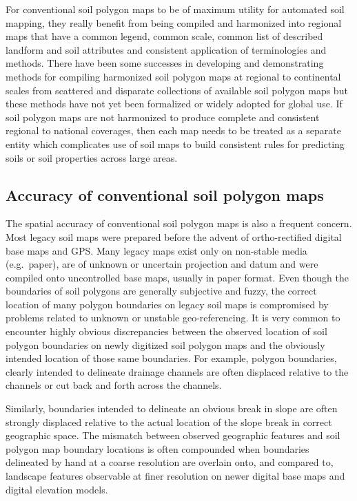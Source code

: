 \documentclass[graybox,natbib,nospthms,UStrade]{svmono}
\begin{document}
For conventional soil polygon maps to be of maximum utility for
automated soil mapping, they really benefit from being compiled and
harmonized into regional maps that have a common legend, common scale,
common list of described landform and soil attributes and consistent
application of terminologies and methods. There have been some successes
in developing and demonstrating methods for compiling harmonized soil
polygon maps at regional to continental scales from scattered and
disparate collections of available soil polygon maps
\citep{Bui2003Geoderma, Grinand2008Geoderma} but these methods have not yet
been formalized or widely adopted for global use. If soil polygon maps
are not harmonized to produce complete and consistent regional to
national coverages, then each map needs to be treated as a separate
entity which complicates use of soil maps to build consistent rules for
predicting soils or soil properties across large areas.

\hypertarget{accuracy-of-conventional-soil-polygon-maps}{%
\subsection{Accuracy of conventional soil polygon maps}\label{accuracy-of-conventional-soil-polygon-maps}}

The spatial accuracy of conventional soil polygon maps is also a
frequent concern. Most legacy soil maps were prepared before the advent
of ortho-rectified digital base maps and GPS. Many legacy maps exist
only on non-stable media (e.g.~paper), are of unknown or uncertain
projection and datum and were compiled onto uncontrolled base maps,
usually in paper format. Even though the boundaries of soil polygons are
generally subjective and fuzzy, the correct location of many polygon
boundaries on legacy soil maps is compromised by problems related to
unknown or unstable geo-referencing. It is very common to encounter
highly obvious discrepancies between the observed location of soil
polygon boundaries on newly digitized soil polygon maps and the
obviously intended location of those same boundaries. For example,
polygon boundaries, clearly intended to delineate drainage channels are
often displaced relative to the channels or cut back and forth across
the channels.

Similarly, boundaries intended to delineate an obvious break in slope
are often strongly displaced relative to the actual location of the
slope break in correct geographic space. The mismatch between observed
geographic features and soil polygon map boundary locations is often
compounded when boundaries delineated by hand at a coarse resolution are
overlain onto, and compared to, landscape features observable at finer
resolution on newer digital base maps and digital elevation models.
\end{document}
